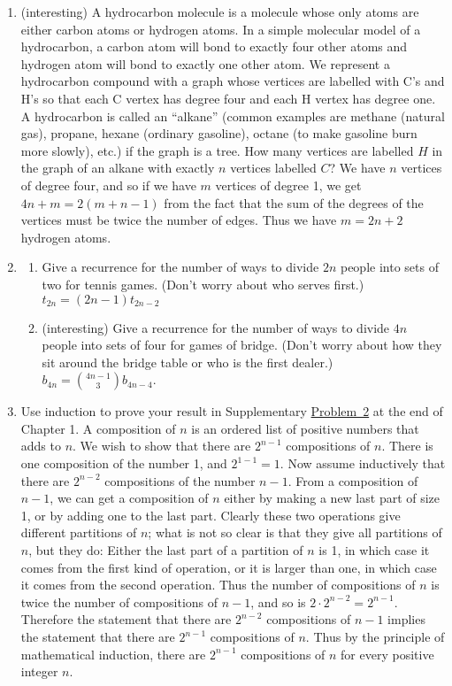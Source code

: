 \documentclass[10pt,]{book}
\theoremstyle{plain}
\theoremstyle{definition}
\numberwithin{equation}{chapter}
\begin{document}
\begin{enumerate}
\bigcup_{i=1}^nA\cap S_i\) holds for all positive integers \(n\).%
%
\item\hypertarget{li-38}{}(interesting) A hydrocarbon molecule is a molecule whose only atoms are either carbon atoms or hydrogen atoms.  In a simple molecular model of a hydrocarbon, a carbon atom will bond to exactly four other atoms and hydrogen atom will bond to exactly one other atom.  We represent a hydrocarbon compound with a graph whose vertices are labelled with C's and H's so that each C vertex has degree four and each H vertex has degree one.  A hydrocarbon is called an ``alkane'' (common examples are methane (natural gas), propane, hexane (ordinary gasoline), octane (to make gasoline burn more slowly), etc.) if the graph is a tree.  How many vertices are labelled \(H\) in the graph of an alkane with exactly \(n\) vertices labelled \(C\)? We have \(n\) vertices of degree four, and so if we have \(m\) vertices of degree 1, we get \(4n+m=2(m+n-1)\) from the fact that the sum of the degrees of the vertices must be twice the number of edges. Thus we have \(m=2n+2\) hydrogen atoms.%
%
\item\hypertarget{li-39}{}%
\begin{enumerate}
\item\hypertarget{li-40}{}Give a recurrence for the number of ways to divide \(2n\) people into sets of two for tennis games.  (Don't worry about who serves first.) \(t_{2n}=(2n-1)t_{2n-2}\)%
%
\item\hypertarget{li-41}{}(interesting) Give a recurrence for the number of ways to divide \(4n\) people into sets of four for games of bridge.  (Don't worry about how they sit around the bridge table or who is the first dealer.) \(b_{4n}={4n-1\choose 3}b_{4n-4}\).%
%
\end{enumerate}
%
\item\hypertarget{li-42}{}Use induction to prove your result in Supplementary \hyperlink{composition_numberof}{Problem~2} at the end of Chapter 1. A composition of \(n\) is an ordered list of positive numbers that adds to \(n\). We wish to show that there are \(2^{n-1}\) compositions of \(n\). There is one composition of the number 1, and \(2^{1-1}=1\). Now assume inductively that there are \(2^{n-2}\) compositions of the number \({n-1}\). From a composition of \(n-1\), we can get a composition of \(n\) either by making a new last part of size 1, or by adding one to the last part. Clearly these two operations give different partitions of \(n\); what is not so clear is that they give all partitions of \(n\), but they do: Either the last part of a partition of \(n\) is 1, in which case it comes from the first kind of operation, or it is larger than one, in which case it comes from the second operation. Thus the number of compositions of \(n\) is twice the number of compositions of \(n-1\), and so is \(2\cdot2^{n-2}=2^{n-1}\). Therefore the statement that there are \(2^{n-2}\) compositions of \(n-1\) implies the statement that there are \(2^{n-1}\) compositions of \(n\). Thus by the principle of mathematical induction, there are \(2^{n-1}\) compositions of \(n\) for every positive integer \(n\).%

\end{enumerate}
\end{document}
